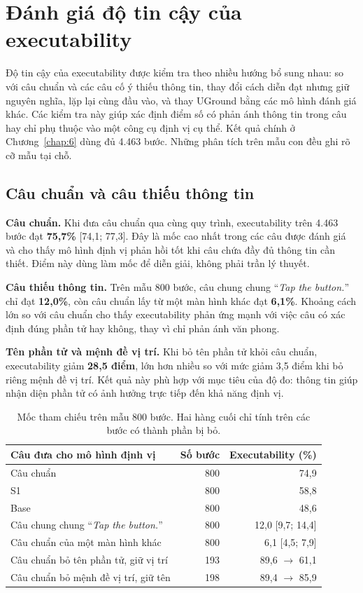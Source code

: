 \section{Đánh giá độ tin cậy của executability}\label{sec:5.tincay}

Độ tin cậy của executability được kiểm tra theo nhiều hướng bổ sung nhau: so với câu chuẩn và các câu cố ý thiếu thông tin, thay đổi cách diễn đạt nhưng giữ nguyên nghĩa, lặp lại cùng đầu vào, và thay UGround bằng các mô hình đánh giá khác. Các kiểm tra này giúp xác định điểm số có phản ánh thông tin trong câu hay chỉ phụ thuộc vào một công cụ định vị cụ thể. Kết quả chính ở Chương~\ref{chap:6} dùng đủ 4.463 bước. Những phân tích trên mẫu con đều ghi rõ cỡ mẫu tại chỗ.

\subsection{Câu chuẩn và câu thiếu thông tin}\label{sec:5.5}\label{sec:5.6}

\textbf{Câu chuẩn.} Khi đưa câu chuẩn qua cùng quy trình, executability trên 4.463 bước đạt \textbf{75,7\%} [74,1; 77,3]. Đây là mốc cao nhất trong các câu được đánh giá và cho thấy mô hình định vị phản hồi tốt khi câu chứa đầy đủ thông tin cần thiết. Điểm này dùng làm mốc để diễn giải, không phải trần lý thuyết.

\textbf{Câu thiếu thông tin.} Trên mẫu 800 bước, câu chung chung ``\emph{Tap the button.}'' chỉ đạt \textbf{12,0\%}, còn câu chuẩn lấy từ một màn hình khác đạt \textbf{6,1\%}. Khoảng cách lớn so với câu chuẩn cho thấy executability phản ứng mạnh với việc câu có xác định đúng phần tử hay không, thay vì chỉ phản ánh văn phong.

\textbf{Tên phần tử và mệnh đề vị trí.} Khi bỏ tên phần tử khỏi câu chuẩn, executability giảm \textbf{28,5 điểm}, lớn hơn nhiều so với mức giảm 3,5 điểm khi bỏ riêng mệnh đề vị trí. Kết quả này phù hợp với mục tiêu của độ đo: thông tin giúp nhận diện phần tử có ảnh hưởng trực tiếp đến khả năng định vị.

\begin{table}[htbp]
\centering\small
\caption{Mốc tham chiếu trên mẫu 800 bước. Hai hàng cuối chỉ tính trên các bước có thành phần bị bỏ.}\label{tab:5.moc}
\begin{tabular}{@{}lrr@{}}
\toprule
\textbf{Câu đưa cho mô hình định vị} & \textbf{Số bước} & \textbf{Executability (\%)} \\
\midrule
Câu chuẩn & 800 & 74,9 \\
S1 & 800 & 58,8 \\
Base & 800 & 48,6 \\
Câu chung chung ``\emph{Tap the button.}'' & 800 & 12,0 [9,7; 14,4] \\
Câu chuẩn của một màn hình khác & 800 & 6,1 [4,5; 7,9] \\
\midrule
Câu chuẩn bỏ tên phần tử, giữ vị trí & 193 & 89,6 $\rightarrow$ 61,1 \\
Câu chuẩn bỏ mệnh đề vị trí, giữ tên & 198 & 89,4 $\rightarrow$ 85,9 \\
\bottomrule
\end{tabular}
\end{table}

